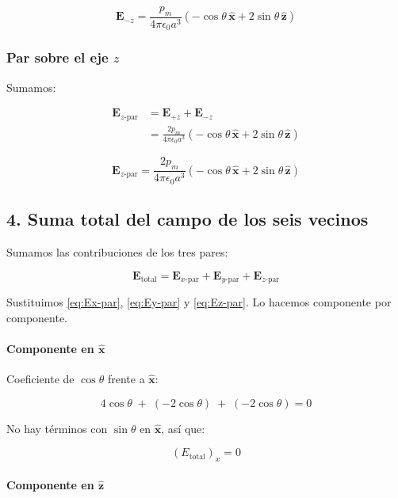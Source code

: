\documentclass{article}
\begin{document}
\begin{equation}
\boxed{
\mathbf{E}_{-z}
= \frac{p_{m}}{4\pi\epsilon_{0}a^{3}}
  \left(-\cos\theta\,\hat{\mathbf{x}} + 2\sin\theta\,\hat{\mathbf{z}}\right)
}
\label{eq:Ez-menos}
\end{equation}

\subsubsection*{Par sobre el eje $z$}

Sumamos:

\begin{align}
\mathbf{E}_{z\text{-par}}
&= \mathbf{E}_{+z} + \mathbf{E}_{-z}\\[4pt]
&= \frac{2p_{m}}{4\pi\epsilon_{0}a^{3}}
   \left(-\cos\theta\,\hat{\mathbf{x}} + 2\sin\theta\,\hat{\mathbf{z}}\right)
\end{align}

\begin{equation}
\boxed{
\mathbf{E}_{z\text{-par}}
= \frac{2p_{m}}{4\pi\epsilon_{0}a^{3}}
  \left(-\cos\theta\,\hat{\mathbf{x}} + 2\sin\theta\,\hat{\mathbf{z}}\right)
}
\label{eq:Ez-par}
\end{equation}

\subsection*{4. Suma total del campo de los seis vecinos}

Sumamos las contribuciones de los tres pares:

\[
\mathbf{E}_{\text{total}}
= \mathbf{E}_{x\text{-par}} + \mathbf{E}_{y\text{-par}} + \mathbf{E}_{z\text{-par}}
\]

Sustituimos \eqref{eq:Ex-par}, \eqref{eq:Ey-par} y \eqref{eq:Ez-par}.  
Lo hacemos componente por componente.

\paragraph{Componente en $\hat{\mathbf{x}}$}

Coeficiente de $\cos\theta$ frente a $\hat{\mathbf{x}}$:

\[
4\cos\theta \;+\; (-2\cos\theta) \;+\; (-2\cos\theta) = 0
\]

No hay términos con $\sin\theta$ en $\hat{\mathbf{x}}$, así que:

\[
(E_{\text{total}})_{x} = 0
\]

\paragraph{Componente en $\hat{\mathbf{z}}$}
\end{document}
